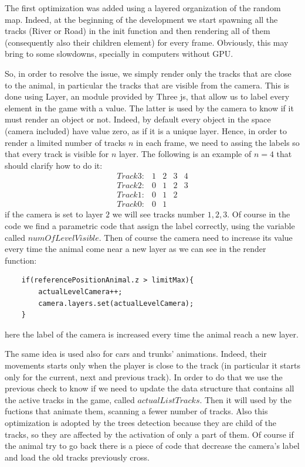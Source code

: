 \documentclass[a4paper, 11pt]{article}
\begin{document}
The first optimization was added using a layered organization of the random map. Indeed, at the beginning of the development we start spawning all the tracks (River or Road) in the init function and then rendering all of them (consequently also their children element) for every frame. Obviously, this may bring to some slowdowns, specially in computers without GPU. 

So, in order to resolve the issue, we simply render only the tracks that are close to the animal, in particular the tracks that are visible from the camera. 
This is done using Layer, an module provided by Three js, that allow us to label every element in the game with a value. The latter is used by the camera to know if it must render an object or not. Indeed, by default every object in the space (camera included) have value zero, as if it is a unique layer. 
Hence, in order to render a limited number of tracks $n$ in each frame, we need to assing the labels so that every track is visible for $n$ layer. The following is an example of $n=4$ that should clarify how to do it:
\begin{equation}
    \begin{array}{lllll}
	Track3: & 1 & 2 & 3 & 4\\
	Track2: & 0 & 1 & 2 & 3\\
	Track1: & 0 & 1 & 2\\
	Track0: & 0 & 1
    \end{array}
\end{equation}
if the camera is set to layer $2$ we will see tracks number $1,2,3$.
Of course in the code we find a parametric code that assign the label correctly, using the variable called $numOfLevelVisible$.
Then of course the camera need to increase its value every time the animal come near a new layer as we can see in the render function:
\begin{lstlisting}
	if(referencePositionAnimal.z > limitMax){
		actualLevelCamera++;
      	camera.layers.set(actualLevelCamera);
	}
\end{lstlisting}
here the label of the camera is increased every time the animal reach a new layer. 

The same idea is used also for cars and trunks' animations. Indeed, their movements starts only when the player is close to the track (in particular it starts only for the current, next and previous track). In order to do that we use the previous check to know if we need to update the data structure that contains all the active tracks in the game, called $actualListTracks$. Then it will used by the fuctions that animate them, scanning a fewer number of tracks. Also this optimization is adopted by the trees detection because they are child of the tracks, so they are affected by the activation of only a part of them. 
Of course if the animal try to go back there is a piece of code that decrease the camera's label and load the old tracks previously cross. \\
\end{document}
